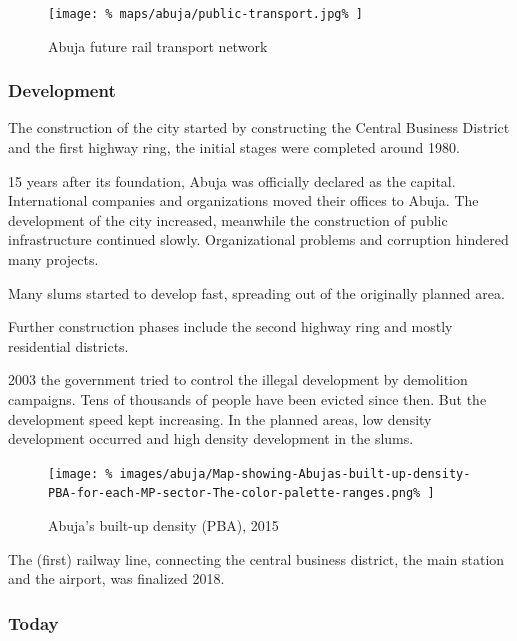 \documentclass[twocolumn]{article}
\begin{document}
			\begin{figure}[H]
				\texttt{[image: \%
					maps/abuja/public-transport.jpg\%
				]}
				\caption{Abuja future rail transport network\cite{ASplusP:AbujaTransportationConcept}}
				\label{fig:map:abuja-future-rail-network}
			\end{figure}	
			
			
			\subsubsection{Development}
			
			The construction of the city started by constructing the Central Business District and the first highway ring, the initial stages were completed around 1980.
			
			15 years after its foundation, Abuja was officially declared as the capital. International companies and organizations moved their offices to Abuja.
			The development of the city increased, meanwhile the construction of public infrastructure continued slowly. Organizational problems and corruption hindered many projects.
			
			Many slums started to develop fast, spreading out of the originally planned area.

			
			
			Further construction phases include the second highway ring and mostly residential districts.
			
			2003 the government tried to control the illegal development by demolition campaigns. Tens of thousands of people have been evicted since then. But the development speed kept increasing. In the planned areas, low density development occurred and high density development in the slums.
			
			\begin{figure}[H]
				\texttt{[image: \%
					images/abuja/Map-showing-Abujas-built-up-density-PBA-for-each-MP-sector-The-color-palette-ranges.png\%
				]}
				\caption{Abuja's built-up density (PBA), 2015\cite{ResearchGate:AbujaDensity}}
				\label{fig:images:abuja-density}
			\end{figure}
			
			The (first) railway line, connecting the central business district, the main station and the airport, was finalized 2018.
			
			
			\subsubsection{Today}
			
\end{document}
